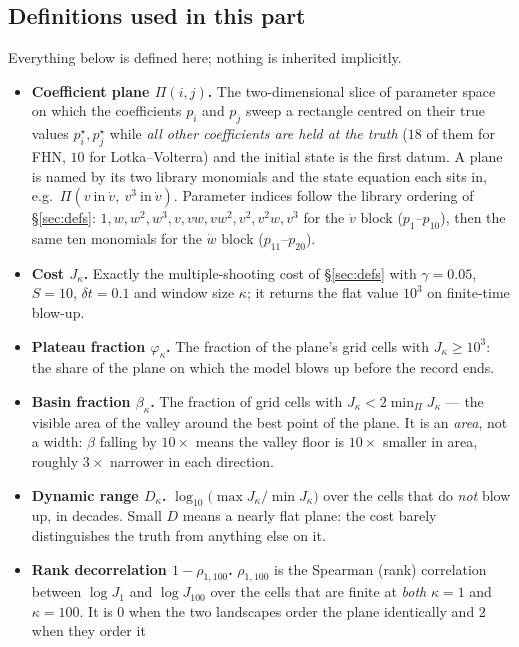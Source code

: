 \documentclass[10pt]{article}
\begin{document}
\subsection{Definitions used in this part}\label{sec:anim2defs}
Everything below is defined here; nothing is inherited implicitly.
\begin{itemize}[leftmargin=1.4em, itemsep=1pt]
\item \textbf{Coefficient plane $\Pi(i,j)$.} The two-dimensional slice of parameter space on which the
coefficients $p_i$ and $p_j$ sweep a rectangle centred on their true values $p^\star_i,p^\star_j$ while
\emph{all other coefficients are held at the truth} ($18$ of them for FHN, $10$ for Lotka--Volterra) and
the initial state is the first datum. A plane is named by its two library monomials and the state
equation each sits in, e.g.\ $\Pi(v\ \text{in}\ \dot v,\ v^3\ \text{in}\ \dot v)$. Parameter indices follow the
library ordering of \S\ref{sec:defs}: $1,w,w^2,w^3,v,vw,vw^2,v^2,v^2w,v^3$ for the $\dot v$ block
($p_1$--$p_{10}$), then the same ten monomials for the $\dot w$ block ($p_{11}$--$p_{20}$).
\item \textbf{Cost $J_\kappa$.} Exactly the multiple-shooting cost of \S\ref{sec:defs} with $\gamma=0.05$,
$S=10$, $\delta t=0.1$ and window size $\kappa$; it returns the flat value $10^3$ on finite-time blow-up.
\item \textbf{Plateau fraction $\varphi_\kappa$.} The fraction of the plane's grid cells with
$J_\kappa\ge10^3$: the share of the plane on which the model blows up before the record ends.
\item \textbf{Basin fraction $\beta_\kappa$.} The fraction of grid cells with
$J_\kappa<2\min_\Pi J_\kappa$ --- the visible area of the valley around the best point of the plane.
It is an \emph{area}, not a width: $\beta$ falling by $10\times$ means the valley floor is $10\times$
smaller in area, roughly $3\times$ narrower in each direction.
\item \textbf{Dynamic range $D_\kappa$.} $\log_{10}\!\big(\max J_\kappa/\min J_\kappa\big)$ over the
cells that do \emph{not} blow up, in decades. Small $D$ means a nearly flat plane: the cost barely
distinguishes the truth from anything else on it.
\item \textbf{Rank decorrelation $1-\rho_{1,100}$.} $\rho_{1,100}$ is the Spearman (rank) correlation
between $\log J_1$ and $\log J_{100}$ over the cells that are finite at \emph{both} $\kappa=1$ and
$\kappa=100$. It is $0$ when the two landscapes order the plane identically and $2$ when they order it

\end{itemize}
\end{document}
